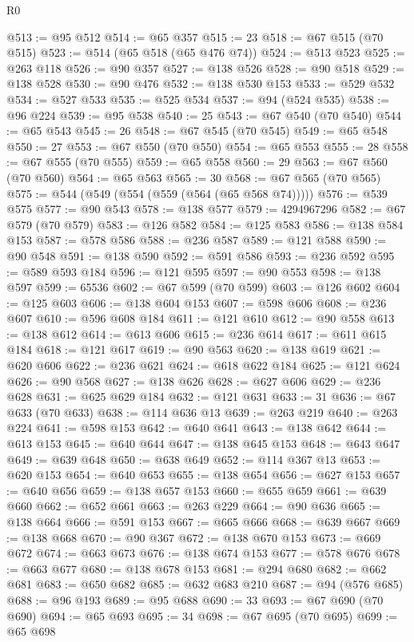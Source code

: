 \begin{lexlean}{R0}
\begin{coremodule}
@513 := @95 @512
@514 := @65 @357
@515 := 23
@518 := @67 @515 (@70 @515)
@523 := @514 (@65 @518 (@65 @476 @74))
@524 := @513 @523
@525 := @263 @118
@526 := @90 @357
@527 := @138 @526
@528 := @90 @518
@529 := @138 @528
@530 := @90 @476
@532 := @138 @530 @153
@533 := @529 @532
@534 := @527 @533
@535 := @525 @534
@537 := @94 (@524 @535)
@538 := @96 @224
@539 := @95 @538
@540 := 25
@543 := @67 @540 (@70 @540)
@544 := @65 @543
@545 := 26
@548 := @67 @545 (@70 @545)
@549 := @65 @548
@550 := 27
@553 := @67 @550 (@70 @550)
@554 := @65 @553
@555 := 28
@558 := @67 @555 (@70 @555)
@559 := @65 @558
@560 := 29
@563 := @67 @560 (@70 @560)
@564 := @65 @563
@565 := 30
@568 := @67 @565 (@70 @565)
@575 := @544 (@549 (@554 (@559 (@564 (@65 @568 @74)))))
@576 := @539 @575
@577 := @90 @543
@578 := @138 @577
@579 := 4294967296
@582 := @67 @579 (@70 @579)
@583 := @126 @582
@584 := @125 @583
@586 := @138 @584 @153
@587 := @578 @586
@588 := @236 @587
@589 := @121 @588
@590 := @90 @548
@591 := @138 @590
@592 := @591 @586
@593 := @236 @592
@595 := @589 @593 @184
@596 := @121 @595
@597 := @90 @553
@598 := @138 @597
@599 := 65536
@602 := @67 @599 (@70 @599)
@603 := @126 @602
@604 := @125 @603
@606 := @138 @604 @153
@607 := @598 @606
@608 := @236 @607
@610 := @596 @608 @184
@611 := @121 @610
@612 := @90 @558
@613 := @138 @612
@614 := @613 @606
@615 := @236 @614
@617 := @611 @615 @184
@618 := @121 @617
@619 := @90 @563
@620 := @138 @619
@621 := @620 @606
@622 := @236 @621
@624 := @618 @622 @184
@625 := @121 @624
@626 := @90 @568
@627 := @138 @626
@628 := @627 @606
@629 := @236 @628
@631 := @625 @629 @184
@632 := @121 @631
@633 := 31
@636 := @67 @633 (@70 @633)
@638 := @114 @636 @13
@639 := @263 @219
@640 := @263 @224
@641 := @598 @153
@642 := @640 @641
@643 := @138 @642
@644 := @613 @153
@645 := @640 @644
@647 := @138 @645 @153
@648 := @643 @647
@649 := @639 @648
@650 := @638 @649
@652 := @114 @367 @13
@653 := @620 @153
@654 := @640 @653
@655 := @138 @654
@656 := @627 @153
@657 := @640 @656
@659 := @138 @657 @153
@660 := @655 @659
@661 := @639 @660
@662 := @652 @661
@663 := @263 @229
@664 := @90 @636
@665 := @138 @664
@666 := @591 @153
@667 := @665 @666
@668 := @639 @667
@669 := @138 @668
@670 := @90 @367
@672 := @138 @670 @153
@673 := @669 @672
@674 := @663 @673
@676 := @138 @674 @153
@677 := @578 @676
@678 := @663 @677
@680 := @138 @678 @153
@681 := @294 @680
@682 := @662 @681
@683 := @650 @682
@685 := @632 @683 @210
@687 := @94 (@576 @685)
@688 := @96 @193
@689 := @95 @688
@690 := 33
@693 := @67 @690 (@70 @690)
@694 := @65 @693
@695 := 34
@698 := @67 @695 (@70 @695)
@699 := @65 @698

\end{coremodule}
\end{lexlean}
